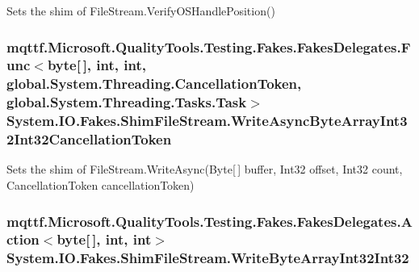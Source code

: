 Sets the shim of File\-Stream.\-Verify\-O\-S\-Handle\-Position()

\hypertarget{class_system_1_1_i_o_1_1_fakes_1_1_shim_file_stream_aa4b7fcf46f980b7ac162eb7ed428ff68}{
\subsubsection[{Write\-Async\-Byte\-Array\-Int32\-Int32\-Cancellation\-Token}]{\setlength{\rightskip}{0pt plus 5cm}mqttf.\-Microsoft.\-Quality\-Tools.\-Testing.\-Fakes.\-Fakes\-Delegates.\-Func$<$byte\mbox{[}$\,$\mbox{]}, int, int, global.\-System.\-Threading.\-Cancellation\-Token, global.\-System.\-Threading.\-Tasks.\-Task$>$ System.\-I\-O.\-Fakes.\-Shim\-File\-Stream.\-Write\-Async\-Byte\-Array\-Int32\-Int32\-Cancellation\-Token\hspace{0.3cm}{\ttfamily [set]}}}\label{class_system_1_1_i_o_1_1_fakes_1_1_shim_file_stream_aa4b7fcf46f980b7ac162eb7ed428ff68}


Sets the shim of File\-Stream.\-Write\-Async(\-Byte\mbox{[}$\,$\mbox{]} buffer, Int32 offset, Int32 count, Cancellation\-Token cancellation\-Token)

\hypertarget{class_system_1_1_i_o_1_1_fakes_1_1_shim_file_stream_a8c20a9f46bca453c955f89905b096fbb}{
\subsubsection[{Write\-Byte\-Array\-Int32\-Int32}]{\setlength{\rightskip}{0pt plus 5cm}mqttf.\-Microsoft.\-Quality\-Tools.\-Testing.\-Fakes.\-Fakes\-Delegates.\-Action$<$byte\mbox{[}$\,$\mbox{]}, int, int$>$ System.\-I\-O.\-Fakes.\-Shim\-File\-Stream.\-Write\-Byte\-Array\-Int32\-Int32\hspace{0.3cm}{\ttfamily [set]}}}\label{class_system_1_1_i_o_1_1_fakes_1_1_shim_file_stream_a8c20a9f46bca453c955f89905b096fbb}


